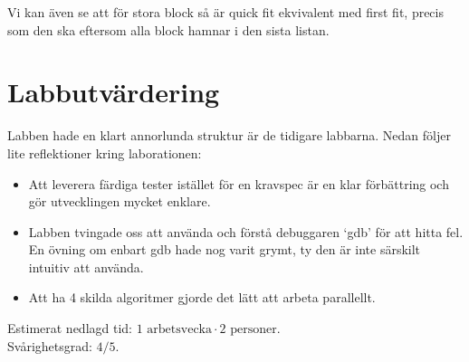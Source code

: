 \documentclass[a4paper,10pt,titlepage]{article}
\begin{document}
Vi kan även se att för stora block så är quick fit ekvivalent med first fit, precis som den ska eftersom alla block hamnar i den sista listan.



\newpage
\section{Labbutvärdering}

Labben hade en klart annorlunda struktur är de tidigare labbarna. Nedan följer lite reflektioner kring laborationen:

\begin{itemize}
	\item Att leverera färdiga tester istället för en kravspec är en klar förbättring och gör utvecklingen mycket enklare.
	\item Labben tvingade oss att använda och förstå debuggaren `gdb' för att hitta fel. En övning om enbart gdb hade nog varit grymt, ty den är inte särskilt intuitiv att använda.
	\item Att ha 4 skilda algoritmer gjorde det lätt att arbeta parallellt.
\end{itemize}

Estimerat nedlagd tid: $1 \text{ arbetsvecka} \cdot 2 \text{ personer}$. \\
Svårighetsgrad: $4/5$.
\end{document}
